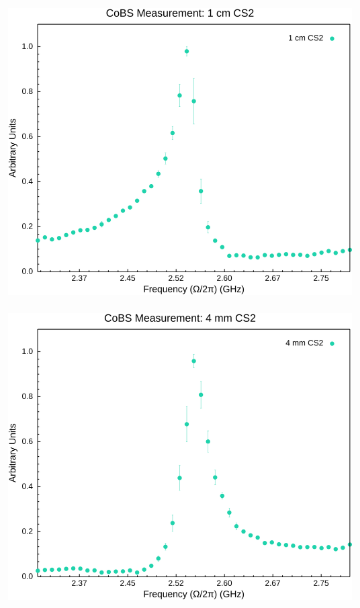 \begin{figure}[t]
  \centering
  \begin{subfigure}[b]{0.49\textwidth}
    \centering
    \hspace{-2em}
    \includegraphics[width=\textwidth]{figs/4-Raman/CoBS Measurement: 1 cm CS2.png}
    \label{fig:Raman:1cmCS2}
  \end{subfigure}
  \hfill
  \begin{subfigure}[b]{0.49\textwidth}
    \centering
    \hspace{-2em}
    \includegraphics[width=\textwidth]{figs/4-Raman/CoBS Measurement: 4 mm CS2.png}

\end{subfigure}
\end{figure}
